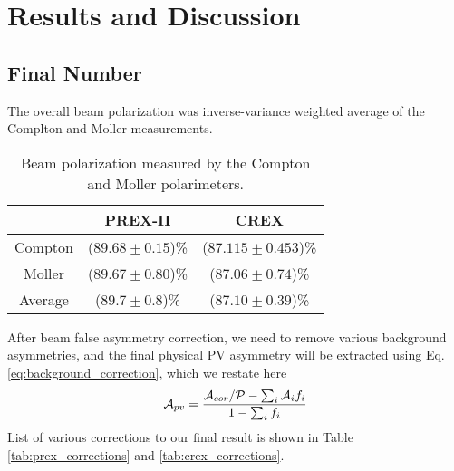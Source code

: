 \chapter{Results and Discussion}

\section{Final Number}

The overall beam polarization was inverse-variance weighted average of the Complton
and Moller measurements.
\begin{table}[!h]
    \centering
    \begin{tabular}{c | c c}
	\hline
	    & PREX-II	& CREX	\\
	\hline
	Compton	& ($89.68 \pm 0.15$)\%  & ($87.115 \pm 0.453$)\%	\\
	Moller	& ($89.67 \pm 0.80$)\%	& ($87.06 \pm 0.74$)\%  \\
	\hline
	Average	& ($89.7 \pm 0.8$)\%	& ($87.10 \pm 0.39$)\%	\\
	\hline
    \end{tabular}
    \caption{Beam polarization measured by the Compton and Moller polarimeters.}
\end{table}

After beam false asymmetry correction, we need to remove various background 
asymmetries, and the final physical PV asymmetry will be extracted using 
Eq. \ref{eq:background_correction}, which we restate here 
\begin{equation*}
    \mathcal{A}_{pv} = \frac{\mathcal{A}_{cor}/\mathcal{P} - \sum_i \mathcal{A}_i f_i}{1 - \sum_i f_i}
\end{equation*}
List of various corrections to our final result is shown in 
Table \ref{tab:prex_corrections} and \ref{tab:crex_corrections}.

